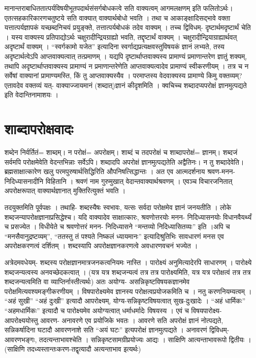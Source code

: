 मानान्तराबाधिततात्पर्यविषयीभूतपदार्थसंसर्गबोधकत्वे सति वाक्यत्वम् आगमलक्षणम् इति फलितोऽर्थः। एतत्सहकारिकारणचतुष्टये सति वाक्यात् वाक्यार्थबोधो भवति । तथा च आकाङ्क्षादिसद्भावे वक्ता यत्तात्पर्यज्ञापकं यच्छब्दनिचयं प्रयुङ्क्ते, तत्तात्पर्यबोधकं तदेव वाक्यम् । तच्च द्विविधम्- दृष्टार्थमदृष्टार्थं चेति । यस्य वाक्यस्य प्रतिपाद्योऽर्थः चक्षुरादीन्द्रियग्राह्यो भवति, तद्दृष्टार्थं वाक्यम् । चक्षुरादीन्द्रियाग्राह्यार्थवत् अदृष्टार्थं वाक्यम् । “स्वर्गकामो यजेत” इत्यादिना स्वर्गाद्यप्रत्यक्षवस्तुविषयकं ज्ञानं लभ्यते, तस्य अदृष्टार्थत्वेऽपि आप्तवाक्यत्वात् तत्प्रमाणम् । यद्यपि दृष्टार्थाप्तवाक्यस्य प्रामाण्यं प्रमाणान्तरेण ज्ञातुं शक्यम्, तथापि अदृष्टार्थाप्तवाक्यस्य प्रामाण्यं न प्रमाणान्तरेणेति आप्तवाक्यत्वादेव प्रामाण्यं स्वीकरणीयम् । तत्र च न सर्वेषां वाक्यानां प्रामाण्यमस्ति, किं तु आप्तवाक्यस्यैव । परमाप्तस्य वेदवाक्यस्य प्रामाण्ये किमु वक्तव्यम्? एतावदेव वक्तव्यं यत्- वाक्याज्जायमानं (शब्दात्)ज्ञानं कीदृशमिति । क्वचिच्च शब्दादप्यपरोक्षं ज्ञानमुत्पद्यते इति वेदान्तिनामाशयः ।

\section*{शाब्दापरोक्षवादः}

शब्देन निर्वर्तितं= शाब्दम्। न परोक्षं= अपरोक्षम्। शाब्दं च तदपरोक्षं च शाब्दापरोक्षं= ज्ञानम्। शब्दजं सर्वमपि परोक्षमेवेति वेदन्तभिन्नाः सर्वेऽपि। शब्दादपि अपरोक्षं ज्ञानमुत्पद्यतेति अद्वैतिनः। न तु शब्दादेवेति। ब्रह्मसाक्षात्कारेण खलु परमपुरुषार्थसिद्धिरिति औपनिषत्सिद्धान्तः । अत एव आत्मदर्शनाय श्रवण-मनन-निदिध्यासनादीनि विहितानि । श्रवणं नाम गुरुमुखात् वेदान्तवाक्यार्थश्रवणम् । एवञ्च विचारजनितात् अपरोक्षरूपात् वाक्यार्थज्ञानात् मुक्तिरित्युक्तं भवति ।

तदयुक्तमिति पूर्वपक्षः । तथाहि- शब्दस्यैषः स्वभावः, यत्सः सर्वदा परोक्षमेव ज्ञानं जनयतीति । लोके शब्दजन्यापरोक्षज्ञानाप्रसिद्धेश्च। यदि वाक्यादेव साक्षात्कारः, श्रवणोत्तरयोः मनन- निदिध्यासनयोः विधानवैयर्थ्यं च प्रसज्येत । विधीयेते च श्रवणोत्तरं मनन- निदिध्यासने “मन्तव्यो निदिध्यासितव्यः” इति ।अपि च “मनसैवानुद्रष्टव्यम्”, “ततस्तु तं पश्यते निष्कलं ध्यायमानः” इत्यादिश्रुतिभिः सावधारणं मनस एव अपरोक्षकरणत्वं दर्शितम् । शब्दस्यापि अपरोक्षज्ञानकरणत्वे अवधारणवचनं भज्येत ।

अत्रेदमवधेयम्- शब्दस्य परोक्षज्ञानमात्रजनकत्वनियमः नास्ति । पारोक्ष्यं अनुमित्यादेरपि साधारणम् । पारोक्ष्ये शब्दजन्यत्वस्य अनवच्छेदकत्वात् । (यत्र यत्र शब्दजन्यत्वं तत्र तत्र पारोक्ष्यमिति, यत्र यत्र परोक्षत्वं तत्र तत्र शब्दजन्यत्वमिति वा व्याप्तिर्नास्तीत्यर्थः) अतः अयोग्य- असन्निकृष्टविषयकज्ञानमेव परोक्षमित्यवश्यमङ्गीकरणीयम् । विषपारोक्ष्यमेव ज्ञानस्य परोक्षत्वप्रयोजकमिति च । नतु करणनियम्यत्वम् । “अहं सुखी” “अहं दुःखी” इत्यादौ आपरोक्ष्यम्, योग्य-सन्निकृष्टविषयत्वात् सुख-दुःखादेः । “अहं धार्मिकः” “अहमधार्मिकः” इत्यादौ च पारोक्ष्यमेव अयोग्यत्वात् धर्माधर्मादेः विषयस्य । एवं च विषयपारोक्ष्य- आपरोक्ष्ययोस्तु आवरण- अनावरणे एव प्रयोजिके भवतः । आवरणे सति अपरोक्षं ज्ञानं नोत्पद्यते, सन्निकर्षादिना घटादौ आवरणनाशे सति “अयं घटः” इत्यपरोक्षं ज्ञानमुत्पद्यते । अनावरणं द्विविधम्- आवरणभङ्गः, तदत्यन्ताभावश्चेति । सन्निकृष्टसामग्रीप्रयोज्यः आद्यः । साक्षिणि आत्यन्ताभावरूपो द्वितीयः ।(साक्षिणि तदध्यस्तान्तःकरण-तद्वृत्यादौ अत्यन्ताभाव इत्यर्थः)

